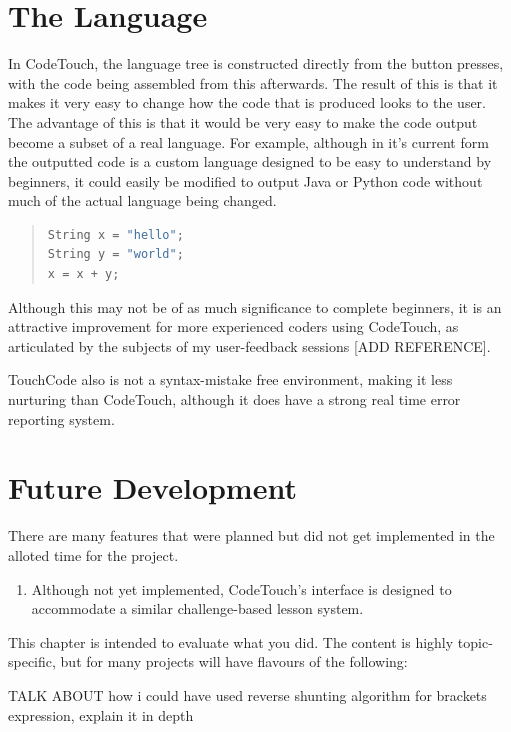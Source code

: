 \documentclass[ %
                    author={Jonathan Rankin},
                supervisor={Dr. David May, Dr. Ian Holyer},
                    degree={MEng},
                     title={CodeTouch},
                  subtitle={A Revolutionary Way To Program Real Code On Touch Screen Devices},
                      type={enterprise},
                      year={2015 } ]{dissertation}
\begin{document}
\section{The Language}
In CodeTouch, the language tree is constructed directly from the button presses, with the code being assembled from this afterwards. The result of this is that it makes it very easy to change how the code that is produced looks to the user. The advantage of this is that it would be very easy to make the code output become a subset of a real language. For example, although in it's current form the outputted code is a custom language designed to be easy to understand by beginners, it could easily be modified to output Java or Python code without much of the actual language being changed.

\begin{quote}
\begin{lstlisting}[label={lst:python},language=Python]
String x = "hello";
String y = "world";
x = x + y;
\end{lstlisting}
\label{lst:label}
\end{quote}

Although this may not be of as much significance to complete beginners, it is an attractive improvement for more experienced coders using CodeTouch, as articulated by the subjects of my user-feedback sessions [ADD REFERENCE].

TouchCode also is not a syntax-mistake free environment, making it less nurturing than CodeTouch, although it does have a strong real time error reporting system.



\section{Future Development}
There are many features that were planned but did not get implemented in the alloted time for the project. 
\begin{enumerate}
\item Although not yet implemented, CodeTouch's interface is designed to accommodate a similar challenge-based lesson system.
\end{enumerate}




This chapter is intended to evaluate what you did.  The content is highly 
topic-specific, but for many projects will have flavours of the following:

TALK ABOUT how i could have used reverse shunting algorithm for brackets expression, explain it in depth
\end{document}
